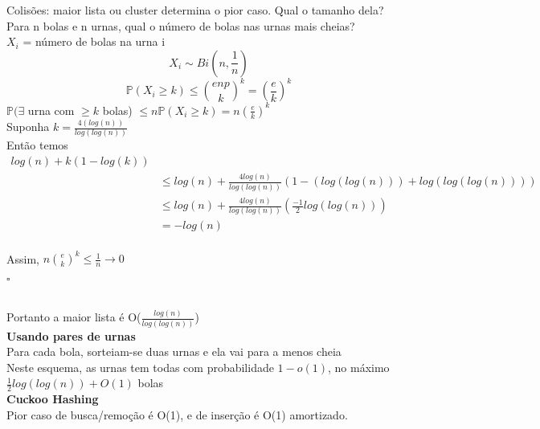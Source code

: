 Colisões: maior lista ou cluster determina o pior caso. Qual o tamanho dela?
\\
Para n bolas e n urnas, qual o número de bolas nas urnas mais cheias?
\\
$X_{i}$ = número de bolas na urna i
\[X_{i}\sim Bi(n,\frac{1}{n})\]
\[\mathbb{P}(X_{i}\geq k) \leq {enp\choose k}^{k} = (\frac{e}{k})^{k}\]
$\mathbb{P}(\exists$ urna com $\geq k$ bolas) $\leq n\mathbb{P}(X_{i}\geq k) = n(\frac{e}{k})^{k}$
\\
Suponha $k = \frac{4(log(n))}{log(log(n))}$
\\
Então temos
\begin{align*}
	log(n)+ k(1-log(k)) \\
	&\leq log(n) + \frac{4log(n)}{log(log(n))}(1-(log(log(n)))+log(log(log(n)))) \\
	&\leq log(n) + \frac{4log(n)}{log(log(n))}(\frac{-1}{2}log(log(n))) \\
	&= -log(n)
\end{align*}
\\
Assim, $n{e\choose k}^{k}\leq\frac{1}{n}\rightarrow 0$\\

\begin{flushright}
$\square$
\end{flushright}\\

Portanto a maior lista é O($\frac{log(n)}{log(log(n))}$)\\

\textbf{Usando pares de urnas}\\
Para cada bola, sorteiam-se duas urnas e ela vai para a menos cheia
\\
Neste esquema, as urnas tem todas com probabilidade $1-o(1)$, no máximo
$\frac{1}{2}log(log(n)) + O(1)$ bolas
\\
\textbf{Cuckoo Hashing}\\
Pior caso de busca/remoção é O(1), e de inserção é O(1) amortizado.
